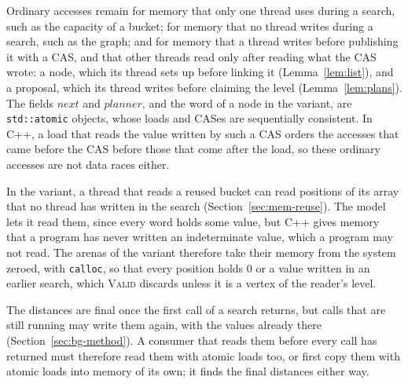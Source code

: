 Ordinary accesses remain for memory that only one thread uses during a search, such as the capacity of a bucket; for memory that no thread writes during a search, such as the graph; and for memory that a thread writes before publishing it with a CAS, and that other threads read only after reading what the CAS wrote: a node, which its thread sets up before linking it (Lemma~\ref{lem:list}), and a proposal, which its thread writes before claiming the level (Lemma~\ref{lem:plans}). The fields $\mathit{next}$ and $\mathit{planner}$, and the word of a node in the variant, are \texttt{std::atomic} objects, whose loads and CASes are sequentially consistent. In C++, a load that reads the value written by such a CAS orders the accesses that came before the CAS before those that come after the load, so these ordinary accesses are not data races either.

In the variant, a thread that reads a reused bucket can read positions of its array that no thread has written in the search (Section~\ref{sec:mem-reuse}). The model lets it read them, since every word holds some value, but C++ gives memory that a program has never written an indeterminate value, which a program may not read. The arenas of the variant therefore take their memory from the system zeroed, with \texttt{calloc}, so that every position holds 0 or a value written in an earlier search, which \textsc{Valid} discards unless it is a vertex of the reader's level.

The distances are final once the first call of a search returns, but calls that are still running may write them again, with the values already there (Section~\ref{sec:bg-method}). A consumer that reads them before every call has returned must therefore read them with atomic loads too, or first copy them with atomic loads into memory of its own; it finds the final distances either way.

